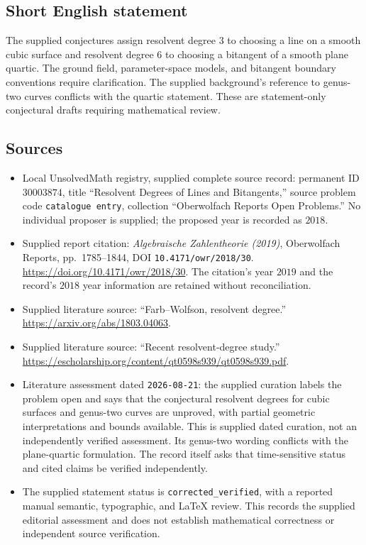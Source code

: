 \documentclass[11pt]{article}
\begin{document}
\subsection{Short English statement}
The supplied conjectures assign resolvent degree \(3\) to choosing a line on a smooth cubic surface and resolvent degree \(6\) to choosing a bitangent of a smooth plane quartic. The ground field, parameter-space models, and bitangent boundary conventions require clarification. The supplied background's reference to genus-two curves conflicts with the quartic statement. These are statement-only conjectural drafts requiring mathematical review.
\subsection{Sources}
\begin{itemize}
\item Local UnsolvedMath registry, supplied complete source record: permanent ID \(30003874\), title ``Resolvent Degrees of Lines and Bitangents,'' source problem code \texttt{catalogue entry}, collection ``Oberwolfach Reports Open Problems.'' No individual proposer is supplied; the proposed year is recorded as \(2018\).
\item Supplied report citation: \emph{Algebraische Zahlentheorie (2019)}, Oberwolfach Reports, pp.\ 1785--1844, DOI \texttt{10.4171/owr/2018/30}. \url{https://doi.org/10.4171/owr/2018/30}. The citation's year \(2019\) and the record's \(2018\) year information are retained without reconciliation.
\item Supplied literature source: ``Farb--Wolfson, resolvent degree.'' \url{https://arxiv.org/abs/1803.04063}.
\item Supplied literature source: ``Recent resolvent-degree study.'' \url{https://escholarship.org/content/qt0598s939/qt0598s939.pdf}.
\item Literature assessment dated \texttt{2026-08-21}: the supplied curation labels the problem open and says that the conjectural resolvent degrees for cubic surfaces and genus-two curves are unproved, with partial geometric interpretations and bounds available. This is supplied dated curation, not an independently verified assessment. Its genus-two wording conflicts with the plane-quartic formulation. The record itself asks that time-sensitive status and cited claims be verified independently.
\item The supplied statement status is \texttt{corrected\_verified}, with a reported manual semantic, typographic, and LaTeX review. This records the supplied editorial assessment and does not establish mathematical correctness or independent source verification.
\end{itemize}
\end{document}
